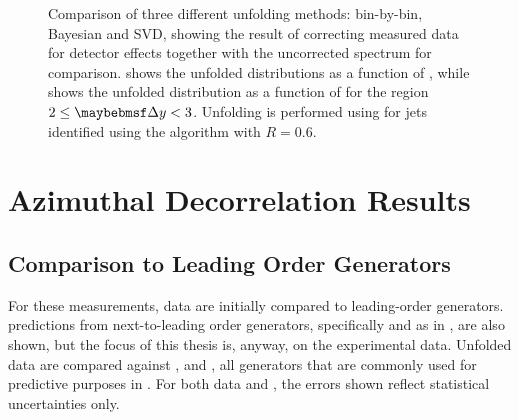 \begin{figure}[htpb]
{    \label{fig:azimuthal-decorrelation:unfolding_dPhi}}
  \caption{Comparison of three different unfolding methods: bin-by-bin, Bayesian
           and SVD, showing the result of correcting measured data for detector
           effects together with the uncorrected spectrum for comparison. \protect{}
           shows the unfolded distributions as a function of \DeltaY, while \protect{}
           shows the unfolded \xs distribution as a function of \DeltaPhi
           for the region $2 \leq \DeltaY < 3$. Unfolding is performed using \Pythia
           \MC for jets identified using the \akt algorithm with $R=0.6$.}
  \label{fig:azimuthal-decorrelation:unfolding}
\end{figure}

\section{Azimuthal Decorrelation Results}
\subsection{Comparison to Leading Order \MC Generators}
For these measurements, data are initially compared to leading-order \MC generators.
predictions from next-to-leading order generators, specifically \Powheg and \HEJ
as in , are also shown, but the focus of this thesis is,
anyway, on the experimental data. Unfolded data are compared against \Pythia,
\Herwigpp and \Alpgen, all generators that are commonly used for predictive
purposes in \ATLAS. For both data and \MC, the errors shown reflect statistical
uncertainties only.  %

